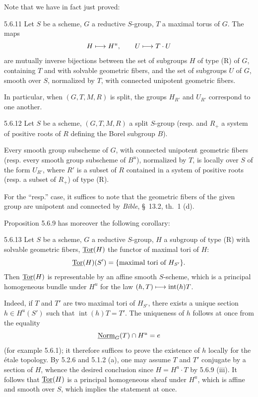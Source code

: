 Note that we have in fact just proved:
\begin{proposition}{5.6.11}\label{XXII.5.6.11}
Let $S$ be a scheme, $G$ a reductive $S$-group, $T$ a maximal torus of $G$. The maps
\[
H\longmapsto H^u,\qquad U\longmapsto T\cdot U
\]
are mutually inverse bijections between the set of subgroups $H$ of type (R) of $G$, containing $T$ and with solvable geometric fibers, and the set of subgroups $U$ of $G$, smooth over $S$, normalized by $T$, with connected unipotent geometric fibers.{\renewcommand{\thefootnote}{(44)}}

In particular, when $(G,T,M,R)$ is split, the groups $H_{R'}$ and $U_{R'}$ correspond to one another.
\end{proposition}
\begin{corollary}{5.6.12}\label{XXII.5.6.12}
Let $S$ be a scheme, $(G,T,M,R)$ a split $S$-group (resp. and $R_+$ a system of positive roots of $R$ defining the Borel subgroup $B$).

Every smooth group subscheme of $G$, with connected unipotent geometric fibers (resp. every smooth group subscheme of $B^u$), normalized by $T$, is locally over $S$ of the form $U_{R'}$, where $R'$ is a subset of $R$ contained in a system of positive roots (resp. a subset of $R_+$) of type (R).
\end{corollary}
For the ``resp.'' case, it suffices to note that the geometric fibers of the given group are unipotent and connected by \textit{Bible}, \S~13.2, th.~1 (d).

Proposition 5.6.9 has moreover the following corollary:
\begin{corollary}{5.6.13}\label{XXII.5.6.13}
Let $S$ be a scheme, $G$ a reductive $S$-group, $H$ a subgroup of type (R) with solvable geometric fibers, $\underline{\operatorname{Tor}}(H)$ the functor of maximal tori of $H$:
\[
\underline{\operatorname{Tor}}(H)(S')=\{\text{maximal tori of }H_{S'}\}.
\]
Then $\underline{\operatorname{Tor}}(H)$ is representable by an affine smooth $S$-scheme, which is a principal homogeneous bundle under $H^u$ for the law $(h,T)\longmapsto\operatorname{int}(h)T$.{\renewcommand{\thefootnote}{(45)}}
\end{corollary}
Indeed, if $T$ and $T'$ are two maximal tori of $H_{S'}$, there exists a unique section $h\in H^u(S')$ such that $\operatorname{int}(h)T=T'$. The uniqueness of $h$ follows at once from the equality
\[
\underline{\mathrm{Norm}}_G(T)\cap H^u=e
\]
(\cf for example 5.6.1); it therefore suffices to prove the existence of $h$ locally for the \'etale topology. By 5.2.6 and 5.1.2 (a), one may assume $T$ and $T'$ conjugate by a section of $H$, whence the desired conclusion since $H=H^u\cdot T$ by 5.6.9 (iii). It follows that $\underline{\operatorname{Tor}}(H)$ is a principal homogeneous sheaf under $H^u$, which is affine and smooth over $S$, which implies the statement at once{\renewcommand{\thefootnote}{(46)}}.

